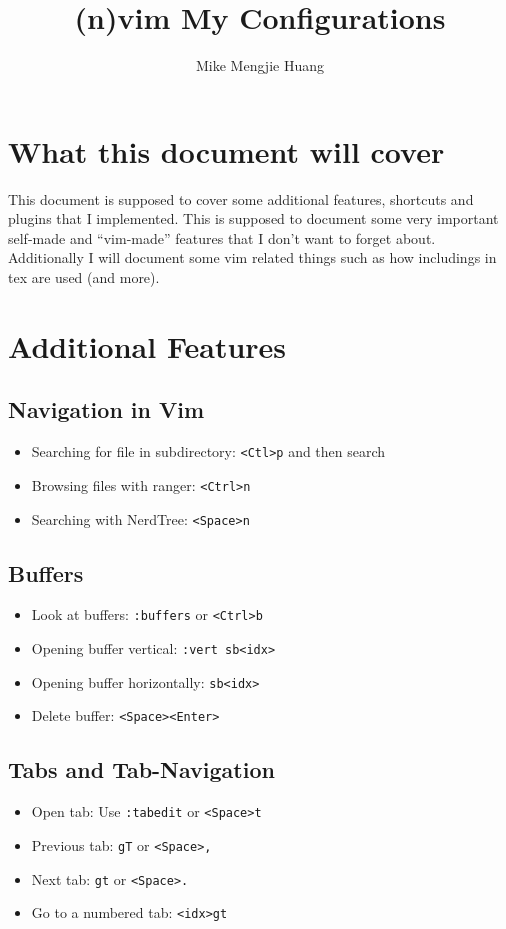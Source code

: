 \documentclass[xcolor=x11names,table]{article}
\title{(n)vim My Configurations}
\author{Mike Mengjie Huang}
\begin{document}
\maketitle
\tableofcontents

\section{What this document will cover}%
\label{sec:What this document will cover}
This document is supposed to cover some additional features, shortcuts and plugins
that I implemented. This is supposed to document some very important 
self-made and ``vim-made'' features that I don't want to forget about. Additionally
I will document some vim related things such as how includings in tex are used 
(and more).
\section{Additional Features}%
\label{sec:Additional Features}
\begin{multicols}{2}
\subsection{Navigation in Vim}%
\label{sub:Navigation in Vim}
\begin{itemize}
    \item Searching for file in subdirectory: \verb!<Ctl>p! and then search \item Browsing files with ranger: \verb!<Ctrl>n!
    \item Searching with NerdTree: \verb!<Space>n!
\end{itemize}
\subsection{Buffers}%
\label{sub:Buffers}
\begin{itemize}
    \item Look at buffers: \verb!:buffers! or \verb!<Ctrl>b!
    \item Opening buffer vertical: \verb!:vert sb<idx>!
    \item Opening buffer horizontally: \verb!sb<idx>!
    \item Delete buffer: \verb!<Space><Enter>!
\end{itemize}
\end{multicols}
\vspace{-5ex}
\subsection{Tabs and Tab-Navigation}%
\label{sub:Tabs and Tab-Navigation}
\vspace{-2ex}
\begin{multicols}{2}
\begin{itemize}
    \item Open tab: Use \verb!:tabedit! or \verb!<Space>t!
    \item Previous tab: \verb!gT! or \verb!<Space>,!
    \item Next tab: \verb!gt! or \verb!<Space>.!
    \item Go to a numbered tab: \verb!<idx>gt!
\end{itemize}
\end{multicols}
\end{document}
